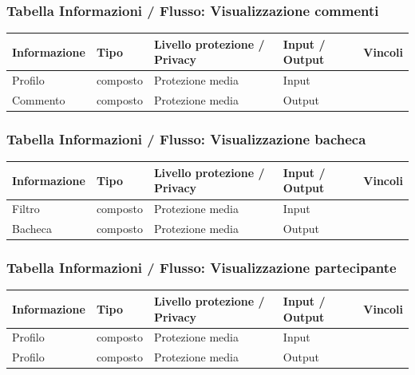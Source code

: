 \documentclass[12pt,a4paper]{report}
\begin{document}
\subsubsection{Tabella Informazioni / Flusso: Visualizzazione commenti}
\begin{tabularx}{\textwidth}{|X|X|X|X|X|}
    \hline
    \rowcolor{studyColor} \textbf{Informazione} & \textbf{Tipo} & \textbf{Livello protezione / Privacy} & \textbf{Input / Output} & \textbf{Vincoli} \\ \hline
    \endhead
    Profilo & composto & Protezione media & Input & \\ \hline
    Commento & composto & Protezione media & Output & \\ \hline
\end{tabularx}

\subsubsection{Tabella Informazioni / Flusso: Visualizzazione bacheca}
\begin{tabularx}{\textwidth}{|X|X|X|X|X|}
    \hline
    \rowcolor{studyColor} \textbf{Informazione} & \textbf{Tipo} & \textbf{Livello protezione / Privacy} & \textbf{Input / Output} & \textbf{Vincoli} \\ \hline
    \endhead
    Filtro & composto & Protezione media & Input & \\ \hline
    Bacheca & composto & Protezione media & Output & \\ \hline
\end{tabularx}

\subsubsection{Tabella Informazioni / Flusso: Visualizzazione partecipante}
\begin{tabularx}{\textwidth}{|X|X|X|X|X|}
    \hline
    \rowcolor{studyColor} \textbf{Informazione} & \textbf{Tipo} & \textbf{Livello protezione / Privacy} & \textbf{Input / Output} & \textbf{Vincoli} \\ \hline
    \endhead
    Profilo & composto & Protezione media & Input & \\ \hline
    Profilo & composto & Protezione media & Output & \\ \hline
\end{tabularx}
\end{document}
